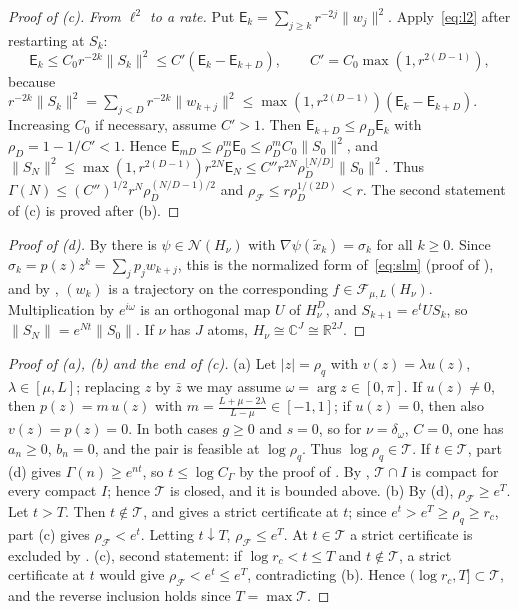 \documentclass[11pt]{article}
\theoremstyle{definition}
\theoremstyle{remark}
\newcommand{\R}{\mathbb R}
\newcommand{\C}{\mathbb C}
\newcommand{\cF}{\mathcal F}
\newcommand{\cS}{\mathcal N}\newcommand{\Szero}{\mathcal S_0}
\newcommand{\cT}{\mathcal T}
\newcommand{\norm}[1]{\lVert #1\rVert}
\newcommand{\rhoF}{\rho_{\cF}}
\begin{document}
\begin{proof}[Proof of (c)]
\emph{From \(\ell^2\) to a rate.}  Put \(\mathsf E_k=\sum_{j\ge k}r^{-2j}\norm{w_j}^2\).
Apply~\eqref{eq:l2} after restarting at \(S_k\):
\[
\mathsf E_k\le C_0r^{-2k}\norm{S_k}^2\le C'(\mathsf E_k-\mathsf E_{k+D}),\qquad C'=C_0\max(1,r^{2(D-1)}),
\]
because \(r^{-2k}\norm{S_k}^2=\sum_{j<D}r^{-2k}\norm{w_{k+j}}^2\le\max(1,r^{2(D-1)})(\mathsf E_k-\mathsf E_{k+D})\).
Increasing \(C_0\) if necessary, assume \(C'>1\).  Then
\(\mathsf E_{k+D}\le \rho_D\mathsf E_k\) with \(\rho_D=1-1/C'<1\).
Hence \(\mathsf E_{mD}\le \rho_D^m\mathsf E_0\le \rho_D^mC_0\norm{S_0}^2\), and
\(\norm{S_N}^2\le\max(1,r^{2(D-1)})r^{2N}\mathsf E_N\le C''r^{2N}\rho_D^{\lfloor N/D\rfloor}\norm{S_0}^2\).  Thus
\(\Gamma(N)\le(C'')^{1/2}r^N\rho_D^{(N/D-1)/2}\) and \(\rhoF\le r \rho_D^{1/(2D)}<r\).
The second statement of (c) is proved after (b).
\end{proof}

\begin{proof}[Proof of (d)]
By  there is \(\psi\in\cS(H_\nu)\) with \(\nabla\psi(\tilde x_k)=\sigma_k\) for all \(k\ge0\).
Since \(\sigma_k=p(z)z^k=\sum_jp_jw_{k+j}\), this is the normalized form
of~\eqref{eq:slm} (proof of ), and by , \((w_k)\) is a
trajectory on the corresponding \(f\in\cF_{\mu,L}(H_\nu)\).  Multiplication by
\(e^{i\omega}\) is an orthogonal map \(U\) of \(H_\nu^D\), and \(S_{k+1}=e^tUS_k\), so
\(\norm{S_N}=e^{Nt}\norm{S_0}\).  If \(\nu\) has \(J\) atoms, \(H_\nu\cong\C^J\cong\R^{2J}\).
\end{proof}

\begin{proof}[Proof of (a), (b) and the end of (c)]
(a) Let \(|z|=\rho_q\) with \(v(z)=\lambda u(z)\), \(\lambda\in[\mu,L]\); replacing \(z\) by \(\bar z\) we
may assume \(\omega=\arg z\in[0,\pi]\).  If \(u(z)\ne0\), then \(p(z)=m\,u(z)\) with
\(m=\frac{L+\mu-2\lambda}{L-\mu}\in[-1,1]\); if \(u(z)=0\), then also \(v(z)=p(z)=0\).  In both cases \(g\ge0\) and \(s=0\), so for
\(\nu=\delta_\omega\), \(C=0\), one has
\(a_n\ge0\), \(b_n=0\), and the pair is feasible at \(\log\rho_q\).  Thus \(\log\rho_q\in\cT\).  If \(t\in\cT\), part (d) gives
\(\Gamma(n)\ge e^{nt}\), so \(t\le\log C_\Gamma\) by the proof of .  By
, \(\cT\cap I\) is compact for every compact \(I\); hence \(\cT\) is closed,
and it is bounded above.
(b) By (d), \(\rhoF\ge e^T\).  Let \(t>T\).  Then \(t\notin\cT\), and  gives a
strict certificate at \(t\); since \(e^t>e^T\ge\rho_q\ge r_c\), part (c) gives \(\rhoF<e^t\).
Letting \(t\downarrow T\), \(\rhoF\le e^T\).  At \(t\in\cT\) a strict certificate is excluded by
.
(c), second statement: if \(\log r_c<t\le T\) and \(t\notin\cT\), a strict certificate at \(t\)
would give \(\rhoF<e^t\le e^T\), contradicting (b).  Hence
\((\log r_c,T]\subset\cT\), and the reverse inclusion holds since \(T=\max\cT\).
\end{proof}
\end{document}
